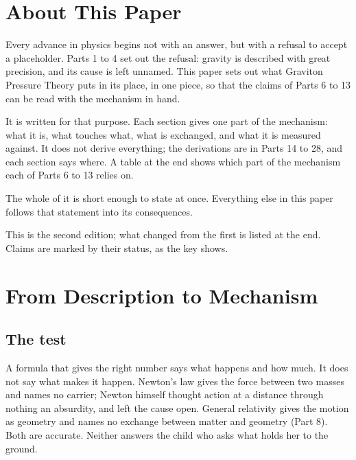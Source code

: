 \newcommand{\gptpart}{5}
\newcommand{\gpttitle}{Graviton Pressure Theory}
\newcommand{\gptsubtitle}{Causality Restored: The Mechanics of Gravitational Force}
\newcommand{\gptdate}{November 2026}

\graphicspath{{figs/}}

\gptitle

\section*{About This Paper}

Every advance in physics begins not with an answer, but with a refusal to accept a placeholder. Parts 1 to 4 set out the refusal: gravity is described with great precision, and its cause is left unnamed. This paper sets out what Graviton Pressure Theory puts in its place, in one piece, so that the claims of Parts 6 to 13 can be read with the mechanism in hand.

It is written for that purpose. Each section gives one part of the mechanism: what it is, what touches what, what is exchanged, and what it is measured against. It does not derive everything; the derivations are in Parts 14 to 28, and each section says where. A table at the end shows which part of the mechanism each of Parts 6 to 13 relies on.

The whole of it is short enough to state at once.  Everything else in this paper follows that statement into its consequences.

This is the second edition; what changed from the first is listed at the end. Claims are marked by their status, as the key shows.

\statuskey

\section{From Description to Mechanism}

\subsection{The test}

 A formula that gives the right number says what happens and how much. It does not say what makes it happen. Newton's law gives the force between two masses and names no carrier; Newton himself thought action at a distance through nothing an absurdity, and left the cause open. General relativity gives the motion as geometry and names no exchange between matter and geometry (Part 8). Both are accurate. Neither answers the child who asks what holds her to the ground.

